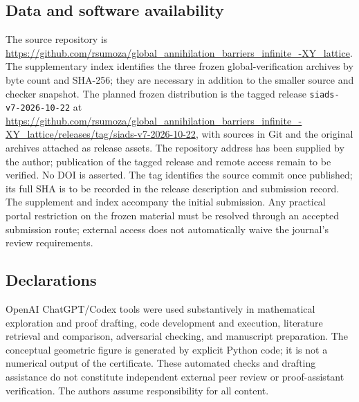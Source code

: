 \subsection*{Data and software availability}
The source repository is
\url{https://github.com/rsumoza/global_annihilation_barriers_infinite_-XY_lattice}.
The supplementary index identifies the three frozen global-verification
archives by byte count and SHA-256; they are necessary in addition to the
smaller source and checker snapshot. The planned frozen distribution is
the tagged release \texttt{siads-v7-2026-10-22} at
\url{https://github.com/rsumoza/global_annihilation_barriers_infinite_-XY_lattice/releases/tag/siads-v7-2026-10-22},
with sources in Git and the original archives attached as release assets.
The repository address has been supplied by the author; publication of
the tagged release and remote access remain to be verified. No DOI is
asserted. The tag identifies the source commit once published; its full
SHA is to be recorded in the release description and submission record.
The supplement and index accompany the initial submission. Any practical
portal restriction on the frozen material must be resolved through an
accepted submission route; external access does not automatically waive
the journal's review requirements.

\subsection*{Declarations}
OpenAI ChatGPT/Codex tools were used substantively in mathematical exploration and proof drafting, code development and execution, literature retrieval and comparison, adversarial checking, and manuscript preparation. The conceptual geometric figure is generated by explicit Python code; it is not a numerical output of the certificate. These automated checks and drafting assistance do not constitute independent external peer review or proof-assistant verification. The authors assume responsibility for all content.
